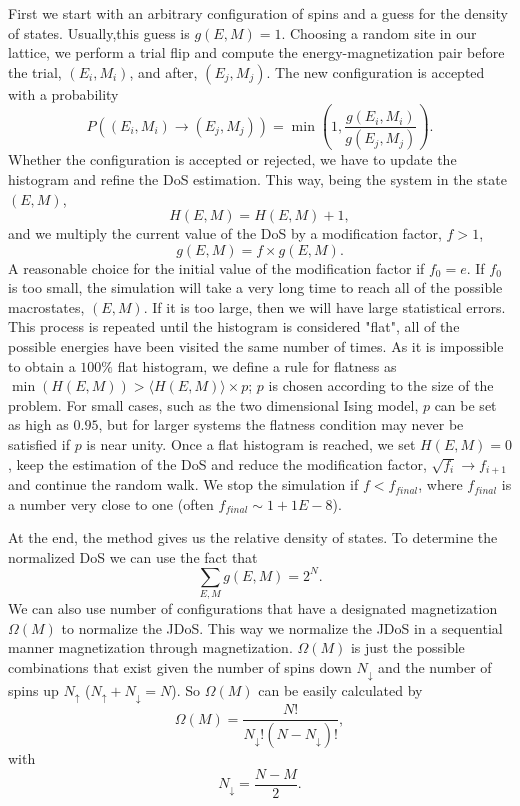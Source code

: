 First we start with an arbitrary configuration of spins and a guess for the density of states. Usually,this  guess is $g(E, M)=1$. Choosing a random site in our lattice, we perform a trial flip and compute the energy-magnetization pair before the trial, $(E_i, M_i)$, and after, $(E_j,M_j)$. The new configuration is accepted with a probability
\begin{equation}
	P((E_i, M_i) \rightarrow (E_j, M_j)) = \min\left(1, \frac{g(E_i, M_i)}{g(E_j, M_j)}\right).
\end{equation}
Whether the configuration is accepted or rejected, we have to update the histogram and refine the DoS estimation. This way, being the system in the state $(E, M)$,
\begin{equation*}
	H(E, M) = H(E,M)+1,
\end{equation*}
and we multiply the current value of the DoS by a modification factor, $f > 1$,
\begin{equation*}
	g(E,M)=f \times g(E,M).
\end{equation*}
A reasonable choice for the initial value of the modification factor if $f_0 = e$. If $f_0$ is too small, the simulation will take a very long time to reach all of the possible macrostates, $(E,M)$. If it is too large, then we will have large statistical errors.  
This process is repeated until the histogram is considered "flat", all of the possible energies have been visited the same number of times. As it is impossible to obtain a $100\%$ flat histogram, we define a rule for flatness as $\min(H(E, M)) > \langle H(E, M) \rangle \times p$; $p$ is chosen according to the size of the problem. For small cases, such as the two dimensional Ising model, $p$ can be set as high as $0.95$, but for larger systems the flatness condition may never be satisfied if $p$ is near unity.  
Once a flat histogram is reached, we set $H(E, M)=0$, keep the estimation of the DoS and reduce the modification factor, $\sqrt{f_{i}} \rightarrow f_{i+1}$ and continue the random walk. We stop the simulation if $f<f_{final}$, where $f_{final}$ is a number very close to one (often $f_{final} \sim 1+1E-8$). 

At the end, the method gives us the relative density of states. To determine the normalized DoS we can use the fact that 
\begin{equation}
	\sum_{E,M} g(E,M) = 2^N.
\end{equation}
We can also use number of configurations that have a designated magnetization $\Omega(M)$ to normalize the JDoS. This way we normalize the JDoS in a sequential manner magnetization through magnetization.
$\Omega(M)$ is just the possible combinations that exist given the number of spins down $N_{\downarrow}$ and the number of spins up $N_{\uparrow}$ ($N_{\uparrow} + N_{\downarrow} = N$). So $\Omega(M)$ can be easily calculated by 
\begin{equation}\label{norm_fact}
	\Omega(M) = \frac{N!}{N_{\downarrow}! (N - N_{\downarrow})!},
\end{equation}
with
\begin{equation}
	N_{\downarrow} = \frac{N-M}{2}.
\end{equation}

